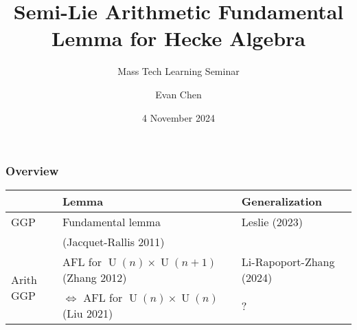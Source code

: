 \documentclass[11pt]{beamer}
\title[Semi-Lie AFL for Hecke]{Semi-Lie Arithmetic Fundamental Lemma for Hecke Algebra}
\subtitle{Mass Tech Learning Seminar}
\author{Evan Chen}
\date{4 November 2024}
\DeclareMathOperator{\U}{U}
\begin{document}
\begin{frame}
  \maketitle
\end{frame}


\begin{frame}
  \frametitle{Overview}
  \begin{tabular}{lp{12em}p{8em}}
    \toprule
    & \textbf{Lemma} & \textbf{Generalization} \\
    \midrule
    GGP & Fundamental lemma & Leslie (2023) \\ & (Jacquet-Rallis 2011) \\
    \midrule
    \multirow{2}{*}[-1em]{Arith GGP} & AFL for $\U(n) \times \U(n+1)$ (Zhang 2012) & Li-Rapoport-Zhang (2024) \\ \cline{2-3}
    & $\iff$ AFL for $\U(n) \times \U(n)$ (Liu 2021) & ? \\
    \bottomrule
  \end{tabular}
\end{frame}
\end{document}
